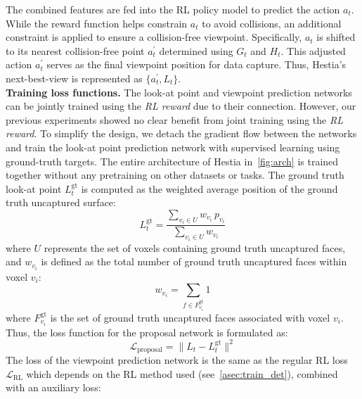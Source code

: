 The combined features are fed into the RL policy model to predict the action $a_t$.  
While the reward function helps constrain $a_t$ to avoid collisions, an additional constraint is applied to ensure a collision-free viewpoint.  
Specifically, $a_t$ is shifted to its nearest collision-free point $a^{'}_{t}$ determined using $G_t$ and $H_t$.  
This adjusted action $a^{'}_{t}$ serves as the final viewpoint position for data capture.  
Thus, Hestia's next-best-view is represented as $\{a^{'}_{t}, L_{t}\}$. %
\\
\textbf{Training loss functions.} %
The look-at point and viewpoint prediction networks can be jointly trained using the \textit{RL reward} due to their connection. 
However, our previous experiments showed no clear benefit from joint training using the \textit{RL reward}. 
To simplify the design, we detach the gradient flow between the networks and train the look-at point prediction network with supervised learning using ground-truth targets.
The entire architecture of Hestia in~\cref{fig:arch} is trained together without any pretraining on other datasets or tasks.
The ground truth look-at point $L_t^\text{gt}$ is computed as the weighted average position of the ground truth uncaptured surface: %
\begin{equation}
L_t^{\text{gt}} = \frac{\sum_{v_i \in U} w_{v_i} \, p_{v_i}}{\sum_{v_i \in U} w_{v_i}}
\end{equation}
where $U$ represents the set of voxels containing ground truth uncaptured faces, and $w_{v_i}$
is defined as the total number of ground truth uncaptured faces within voxel $v_i$:
\begin{equation}
w_{v_i} = \sum_{f \in F_{v_i}^{\text{gt}}} 1
\end{equation}
where $F_{v_i}^{\text{gt}}$ is the set of ground truth uncaptured faces associated with voxel $v_i$.  
Thus, the loss function for the proposal network is formulated as: %
\begin{equation}
\mathcal{L}_{\text{proposal}} = \|L_t -L_t^{\text{gt}}\|^2
\end{equation}
The loss of the viewpoint prediction network is the same as the regular RL loss $\mathcal{L}_{\text{RL}}$ which depends on the RL method used (see~\cref{asec:train_det}), combined with an auxiliary loss: %
